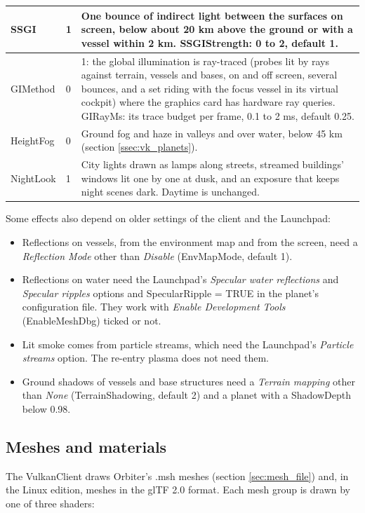 \documentclass[Orbiter Developer Manual.tex]{subfiles}
\begin{document}
\begin{sloppypar}
\begin{longtable}{ |p{}|p{}|p{}| }
	\hline\rule{0pt}{2ex}
	SSGI & 1 & One bounce of indirect light between the surfaces on screen, below about 20 km above the ground or with a vessel within 2 km. SSGIStrength: 0 to 2, default 1.\\
	\hline\rule{0pt}{2ex}
	GIMethod & 0 & 1: the global illumination is ray-traced (probes lit by rays against terrain, vessels and bases, on and off screen, several bounces, and a set riding with the focus vessel in its virtual cockpit) where the graphics card has hardware ray queries. GIRayMs: its trace budget per frame, 0.1 to 2 ms, default 0.25.\\
	\hline\rule{0pt}{2ex}
	HeightFog & 0 & Ground fog and haze in valleys and over water, below 45 km (section \ref{ssec:vk_planets}).\\
	\hline\rule{0pt}{2ex}
	NightLook & 1 & City lights drawn as lamps along streets, streamed buildings' windows lit one by one at dusk, and an exposure that keeps night scenes dark. Daytime is unchanged.\\
	\hline
	\end{longtable}

\noindent
Some effects also depend on older settings of the client and the Launchpad:

\begin{itemize}
\item Reflections on vessels, from the environment map and from the screen, need a \textit{Reflection Mode} other than \textit{Disable} (EnvMapMode, default 1).
\item Reflections on water need the Launchpad's \textit{Specular water reflections} and \textit{Specular ripples} options and SpecularRipple = TRUE in the planet's configuration file. They work with \textit{Enable Development Tools} (EnableMeshDbg) ticked or not.
\item Lit smoke comes from particle streams, which need the Launchpad's \textit{Particle streams} option. The re-entry plasma does not need them.
\item Ground shadows of vessels and base structures need a \textit{Terrain mapping} other than \textit{None} (TerrainShadowing, default 2) and a planet with a ShadowDepth below 0.98.
\end{itemize}


\subsection{Meshes and materials}
\label{ssec:vk_mesh}
The VulkanClient draws Orbiter's .msh meshes (section \ref{sec:mesh_file}) and, in the Linux edition, meshes in the glTF 2.0 format. Each mesh group is drawn by one of three shaders:


\end{sloppypar}
\end{document}
